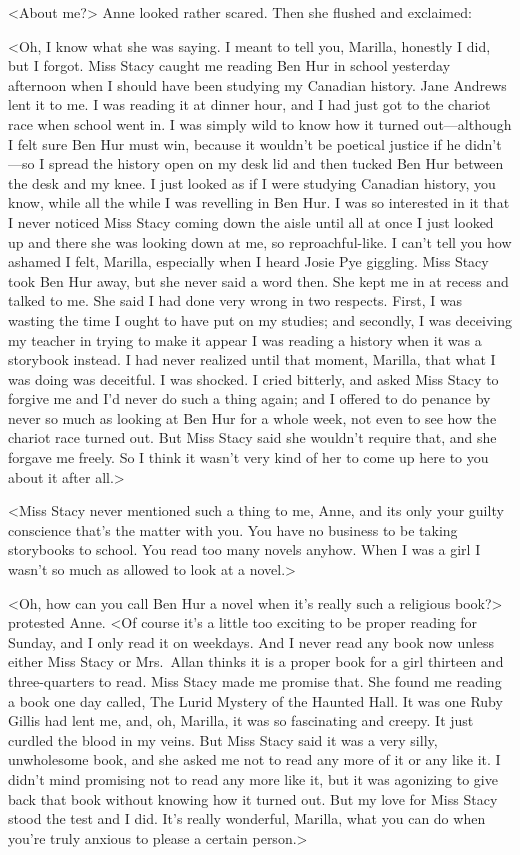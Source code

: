 <About me?> Anne looked rather scared. Then she flushed and exclaimed:

<Oh, I know what she was saying. I meant to tell you, Marilla, honestly I did, but I forgot. Miss Stacy caught me reading Ben Hur in school yesterday afternoon when I should have been studying my Canadian history. Jane Andrews lent it to me. I was reading it at dinner hour, and I had just got to the chariot race when school went in. I was simply wild to know how it turned out—although I felt sure Ben Hur must win, because it wouldn't be poetical justice if he didn't—so I spread the history open on my desk lid and then tucked Ben Hur between the desk and my knee. I just looked as if I were studying Canadian history, you know, while all the while I was revelling in Ben Hur. I was so interested in it that I never noticed Miss Stacy coming down the aisle until all at once I just looked up and there she was looking down at me, so reproachful-like. I can't tell you how ashamed I felt, Marilla, especially when I heard Josie Pye giggling. Miss Stacy took Ben Hur away, but she never said a word then. She kept me in at recess and talked to me. She said I had done very wrong in two respects. First, I was wasting the time I ought to have put on my studies; and secondly, I was deceiving my teacher in trying to make it appear I was reading a history when it was a storybook instead. I had never realized until that moment, Marilla, that what I was doing was deceitful. I was shocked. I cried bitterly, and asked Miss Stacy to forgive me and I'd never do such a thing again; and I offered to do penance by never so much as looking at Ben Hur for a whole week, not even to see how the chariot race turned out. But Miss Stacy said she wouldn't require that, and she forgave me freely. So I think it wasn't very kind of her to come up here to you about it after all.>

<Miss Stacy never mentioned such a thing to me, Anne, and its only your guilty conscience that's the matter with you. You have no business to be taking storybooks to school. You read too many novels anyhow. When I was a girl I wasn't so much as allowed to look at a novel.>

<Oh, how can you call Ben Hur a novel when it's really such a religious book?> protested Anne. <Of course it's a little too exciting to be proper reading for Sunday, and I only read it on weekdays. And I never read any book now unless either Miss Stacy or Mrs.~Allan thinks it is a proper book for a girl thirteen and three-quarters to read. Miss Stacy made me promise that. She found me reading a book one day called, The Lurid Mystery of the Haunted Hall. It was one Ruby Gillis had lent me, and, oh, Marilla, it was so fascinating and creepy. It just curdled the blood in my veins. But Miss Stacy said it was a very silly, unwholesome book, and she asked me not to read any more of it or any like it. I didn't mind promising not to read any more like it, but it was agonizing to give back that book without knowing how it turned out. But my love for Miss Stacy stood the test and I did. It's really wonderful, Marilla, what you can do when you're truly anxious to please a certain person.>


